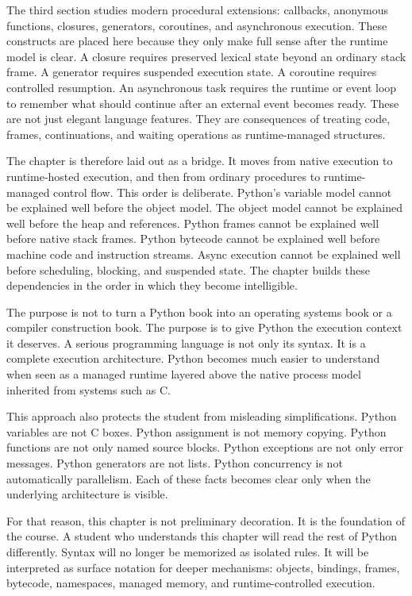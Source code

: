\documentclass[a4paper,twoside]{report}
\begin{document}
The third section studies modern procedural extensions: callbacks, anonymous functions, closures, generators, coroutines, and asynchronous execution. These constructs are placed here because they only make full sense after the runtime model is clear. A closure requires preserved lexical state beyond an ordinary stack frame. A generator requires suspended execution state. A coroutine requires controlled resumption. An asynchronous task requires the runtime or event loop to remember what should continue after an external event becomes ready. These are not just elegant language features. They are consequences of treating code, frames, continuations, and waiting operations as runtime-managed structures.

The chapter is therefore laid out as a bridge. It moves from native execution to runtime-hosted execution, and then from ordinary procedures to runtime-managed control flow. This order is deliberate. Python's variable model cannot be explained well before the object model. The object model cannot be explained well before the heap and references. Python frames cannot be explained well before native stack frames. Python bytecode cannot be explained well before machine code and instruction streams. Async execution cannot be explained well before scheduling, blocking, and suspended state. The chapter builds these dependencies in the order in which they become intelligible.

The purpose is not to turn a Python book into an operating systems book or a compiler construction book. The purpose is to give Python the execution context it deserves. A serious programming language is not only its syntax. It is a complete execution architecture. Python becomes much easier to understand when seen as a managed runtime layered above the native process model inherited from systems such as C.

This approach also protects the student from misleading simplifications. Python variables are not C boxes. Python assignment is not memory copying. Python functions are not only named source blocks. Python exceptions are not only error messages. Python generators are not lists. Python concurrency is not automatically parallelism. Each of these facts becomes clear only when the underlying architecture is visible.

For that reason, this chapter is not preliminary decoration. It is the foundation of the course. A student who understands this chapter will read the rest of Python differently. Syntax will no longer be memorized as isolated rules. It will be interpreted as surface notation for deeper mechanisms: objects, bindings, frames, bytecode, namespaces, managed memory, and runtime-controlled execution.
\end{document}
